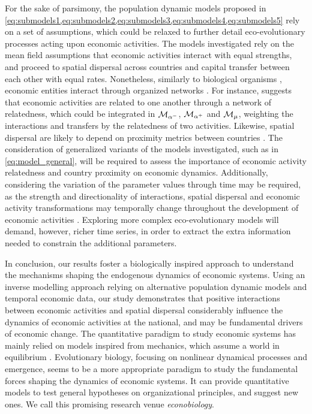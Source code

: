 For the sake of parsimony, the population dynamic models proposed in \cref{eq:submodels1,eq:submodels2,eq:submodels3,eq:submodels4,eq:submodels5} rely on a set of assumptions, which could be relaxed to further detail eco-evolutionary processes acting upon economic activities. 
% 
The models investigated rely on the mean field assumptions that economic activities interact with equal strengths, and proceed to spatial dispersal across countries and capital transfer between each other with equal rates.
% 
Nonetheless, similarly to biological organisms \citep{Bascompte2003}, economic entities interact through organized networks \citep{C.A.HidalgoB.Klinger,Bustos2012,Saavedra2009a,Schweitzer2009,Giuliani2007}. For instance, \cite{C.A.HidalgoB.Klinger} suggests that economic activities are related to one another through a network of relatedness, which could be integrated in $\mathcal{M}_{\alpha^-}$, $\mathcal{M}_{\alpha^+}$ and $\mathcal{M}_\mu$, weighting the interactions and transfers by the relatedness of two activities. 
% 
% 
Likewise, spatial dispersal are likely to depend on proximity metrics between countries \citep{Boschma2005,Caragliu2016,Bahar2014a}. The consideration of generalized variants of the models investigated, such as in \cref{eq:model_general}, will be required to assess the importance of economic activity relatedness and country proximity on economic dynamics. Additionally, considering the variation of the parameter values through time may be required, as the strength and directionality of interactions, spatial dispersal and economic activity transformations may temporally change throughout the development of economic activities \citep{Pistorius1997}. 
% 
Exploring more complex eco-evolutionary models will demand, however, richer time series, in order to extract the extra information needed to constrain the additional parameters.

In conclusion, our results foster a biologically inspired approach to understand the mechanisms shaping the endogenous dynamics of economic systems. Using an inverse modelling approach relying on alternative population dynamic models and temporal economic data, our study demonstrates that positive interactions between economic activities and spatial dispersal considerably influence the dynamics of economic activities at the national, and may be fundamental drivers of economic change.
% 
The quantitative paradigm to study economic systems has mainly relied on models inspired from mechanics, which assume a world in equilibrium \citep{sornette2014physics}.
% 
Evolutionary biology, focusing on nonlinear dynamical processes and emergence, seems to be a more appropriate paradigm to study the fundamental forces shaping the dynamics of economic systems. It can provide quantitative models to test general hypotheses on organizational principles, and suggest new ones. We call this promising research venue \emph{econobiology}.

